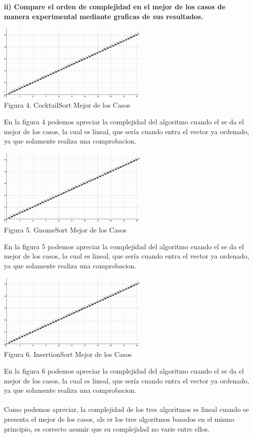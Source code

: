 \documentclass[spanish]{article}
\begin{document}
	\bigskip
	\newpage
	{\large{\bf ii) Compare el orden de complejidad en el mejor de los casos de manera experimental mediante graficas de sus resultados.}}\\
	
	\bigskip
		\begin{center}
			\includegraphics[width=0.55\textwidth]{./imagenes/cocktailMC.PNG}\\
			Figura 4. CocktailSort Mejor de los Casos\\
		\end{center}
	En la figura 4 podemos apreciar la complejidad del algoritmo cuando el se da el mejor de los casos, la cual es lineal, que sería cuando entra el vector ya ordenado, ya que solamente realiza una comprobacion.
		\begin{center}
			\includegraphics[width=0.55\textwidth]{./imagenes/gnomeMC.PNG}\\
			Figura 5. GnomeSort Mejor de los Casos\\
		\end{center}
En la figura 5 podemos apreciar la complejidad del algoritmo cuando el se da el mejor de los casos, la cual es lineal, que sería cuando entra el vector ya ordenado, ya que solamente realiza una comprobacion.
\newpage
		\begin{center}
			\includegraphics[width=0.55\textwidth]{./imagenes/insertionMC.PNG}\\
			Figura 6. InsertionSort Mejor de los Casos\\
		\end{center}
En la figura 6 podemos apreciar la complejidad del algoritmo cuando el se da el mejor de los casos, la cual es lineal, que sería cuando entra el vector ya ordenado, ya que solamente realiza una comprobacion.
\\\\
Como podemos apreciar, la complejidad de los tres algoritmos es lineal cuando se presenta el mejor de los casos, als er los tres algoritmos basados en el mismo principio, es correcto asumir que su complejidad no varie entre ellos.
\end{document}
